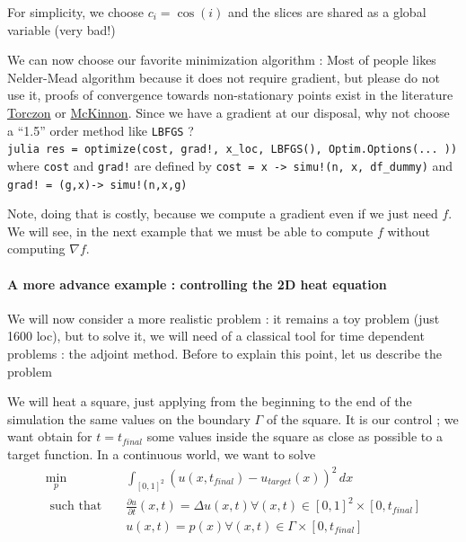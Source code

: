 \documentclass[11pt]{article}
\begin{document}
{For simplicity, we choose \(c_i = \cos(i)\) and the slices are shared as
a global variable (very bad!)

We can now choose our favorite minimization algorithm : Most of people
likes Nelder-Mead algorithm because it does not require gradient, but
please do not use it, proofs of convergence towards non-stationary
points exist in the literature
\href{http://citeseerx.ist.psu.edu/viewdoc/summary?doi=10.1.1.48.9967}{Torczon}
or
\href{https://www.researchgate.net/publication/2763859_Convergence_of_the_Nelder-Mead_simplex_method_to_a_non-stationary_point}{McKinnon}.
Since we have a gradient at our disposal, why not choose a ``1.5'' order
method like \texttt{LBFGS} ?
\texttt{julia\ res\ =\ optimize(cost,\ grad!,\ x\_loc,\ LBFGS(),\ Optim.Options(...\ ))}
where \texttt{cost} and \texttt{grad!} are defined by
\texttt{cost\ =\ x\ -\textgreater{}\ simu!(n,\ x,\ df\_dummy)} and
\texttt{grad!\ =\ (g,x)-\textgreater{}\ simu!(n,x,g)}

Note, doing that is costly, because we compute a gradient even if we
just need \(f\). We will see, in the next example that we must be able
to compute \(f\) without computing \(\nabla f\).

\hypertarget{a-more-advance-example-controlling-the-2d-heat-equation}{%
\paragraph{A more advance example : controlling the 2D heat
equation}\label{a-more-advance-example-controlling-the-2d-heat-equation}}

We will now consider a more realistic problem : it remains a toy problem
(just 1600 loc), but to solve it, we will need of a classical tool for
time dependent problems : the adjoint method. Before to explain this
point, let us describe the problem

We will heat a square, just applying from the beginning to the end of
the simulation the same values on the boundary \(\Gamma\) of the square.
It is our control ; we want obtain for \(t=t_{final}\) some values
inside the square as close as possible to a target function. In a
continuous world, we want to solve \begin{eqnarray}
   \min_p && \int_{[0,1]^2} (u(x,t_{final}) - u_{target}(x))^2 \, dx \\
   \mbox { such that }     && \frac{\partial u}{\partial t} (x,t) = \Delta u(x,t) \forall (x,t) \in [0,1]^2 \times [0,t_{final}] \\ 
    && u(x,t) = p(x)  \forall  (x,t) \in \Gamma \times [0,t_{final}]
\end{eqnarray}

}
\end{document}
